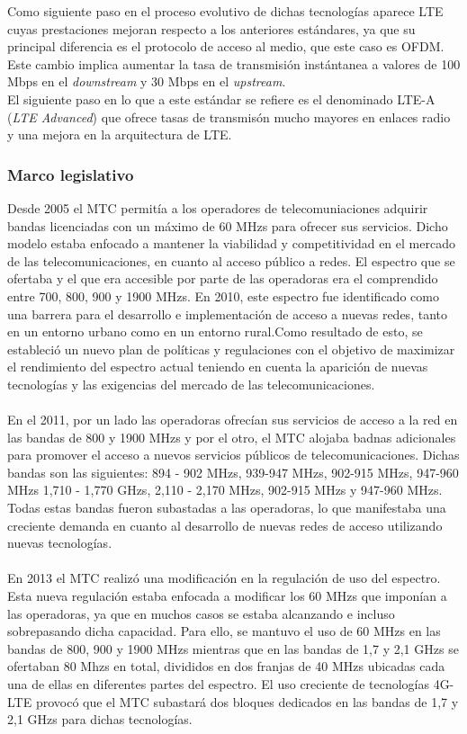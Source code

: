 Como siguiente paso en el proceso evolutivo de dichas tecnologías aparece LTE cuyas prestaciones mejoran respecto a los anteriores estándares, ya que su principal diferencia es el protocolo de acceso al medio, que este caso es OFDM. Este cambio implica aumentar la tasa de transmisión instántanea a valores de 100 Mbps en el \textit{downstream} y 30 Mbps en el \textit{upstream}.\\
El siguiente paso en lo que a este estándar se refiere es el denominado LTE-A (\textit{LTE Advanced}) que ofrece tasas de transmisón mucho mayores en enlaces radio y una mejora en la arquitectura de LTE.

\subsubsection{Marco legislativo}
Desde 2005 el MTC permitía a los operadores de telecomuniaciones adquirir bandas licenciadas con un máximo de 60 MHzs para ofrecer sus servicios. Dicho modelo estaba enfocado a mantener la viabilidad y competitividad en el mercado de las telecomunicaciones, en cuanto al acceso público a redes. El espectro que se ofertaba y el que era accesible por parte de las operadoras era el comprendido entre 700, 800, 900 y 1900 MHzs. En 2010, este espectro fue identificado como una barrera para el desarrollo e implementación de acceso a nuevas redes, tanto en un entorno urbano como en un entorno rural.Como resultado de esto, se estableció un nuevo plan de políticas y regulaciones con el objetivo de maximizar el rendimiento del espectro actual teniendo en cuenta la aparición de nuevas tecnologías y las exigencias del mercado de las telecomunicaciones.\\\\

En el 2011,  por un lado las operadoras ofrecían sus servicios de acceso a la red en las bandas de 800 y 1900 MHzs y por el otro, el MTC alojaba badnas adicionales para promover el acceso a nuevos servicios públicos de telecomunicaciones. Dichas bandas son las siguientes: 894 - 902 MHzs, 939-947 MHzs, 902-915 MHzs, 947-960 MHzs 1,710 - 1,770 GHzs, 2,110 - 2,170 MHzs, 902-915 MHzs y 947-960 MHzs. Todas estas bandas fueron subastadas a las operadoras, lo que manifestaba una creciente demanda en cuanto al desarrollo de nuevas redes de acceso utilizando nuevas tecnologías.\\\\

En 2013 el MTC realizó una modificación en la regulación de uso del espectro. Esta nueva regulación estaba enfocada a modificar los 60 MHzs que imponían a las operadoras, ya que en muchos casos se estaba alcanzando e incluso sobrepasando dicha capacidad. Para ello, se mantuvo el uso de 60 MHzs en las bandas de 800, 900 y 1900 MHzs mientras que en las bandas de 1,7 y 2,1 GHzs se ofertaban 80 Mhzs en total, divididos en dos franjas de 40 MHzs ubicadas cada una de ellas en diferentes partes del espectro. El uso creciente de tecnologías 4G-LTE provocó que el MTC subastará dos bloques dedicados en las bandas de 1,7 y 2,1 GHzs para dichas tecnologías.

